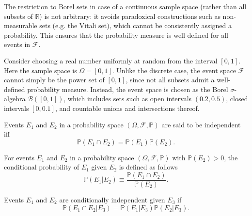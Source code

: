 \begin{remark}
	The restriction to Borel sets in case of a continuous sample space (rather than all subsets of $\mathbb{R}$) is not arbitrary: it avoids paradoxical constructions such as non-measurable sets (e.g. the Vitali set), which cannot be consistently assigned a probability. This ensures that the probability measure is well defined for all events in $\mathcal{F}$.
\end{remark}

\begin{example}
	Consider choosing a real number uniformly at random from the interval $[0,1]$. Here the sample space is $\Omega = [0,1]$. Unlike the discrete case, the event space $\mathcal{F}$ cannot simply be the power set of $[0,1]$, since not all subsets admit a well-defined probability measure. Instead, the event space is chosen as the Borel $\sigma$-algebra $\mathcal{B}([0,1])$, which includes sets such as open intervals $(0.2, 0.5)$, closed intervals $[0, 0.1]$, and countable unions and intersections thereof.
\end{example}


\begin{definition}[Independence]
	\label{def:independence}
	Events $E_1$ and $E_2$  in a probability space $(\Omega, \mathcal{F}, \mathbb{P})$ are said to be independent iff
	\begin{equation}
		\mathbb{P}(E_1 \cap E_2) = \mathbb{P}(E_1) \mathbb{P}(E_2).
		\label{eq:ind}
	\end{equation}
\end{definition}

\begin{definition}
	\label{def:conditional_probability}
	For events $E_1$ and $E_2$ in a probability space $(\Omega, \mathcal{F}, \mathbb{P})$ with $\mathbb{P}(E_2) > 0$, the conditional probability of $E_1$ given $E_2$ is defined as follows
	\begin{equation}
		\mathbb{P}(E_1|E_2) \equiv \frac{\mathbb{P}(E_1 \cap E_2)}{\mathbb{P}(E_2)}.
		\label{eq:cond}
	\end{equation}
\end{definition}

\begin{definition}
\label{def:conditional_independence}
Events $E_1$ and $E_2$ are conditionally independent given $E_3$ if
\begin{equation}
\mathbb{P}(E_1 \cap E_2 | E_3) = \mathbb{P}(E_1|E_3)\mathbb{P}(E_2|E_3).
\end{equation}
\end{definition}


